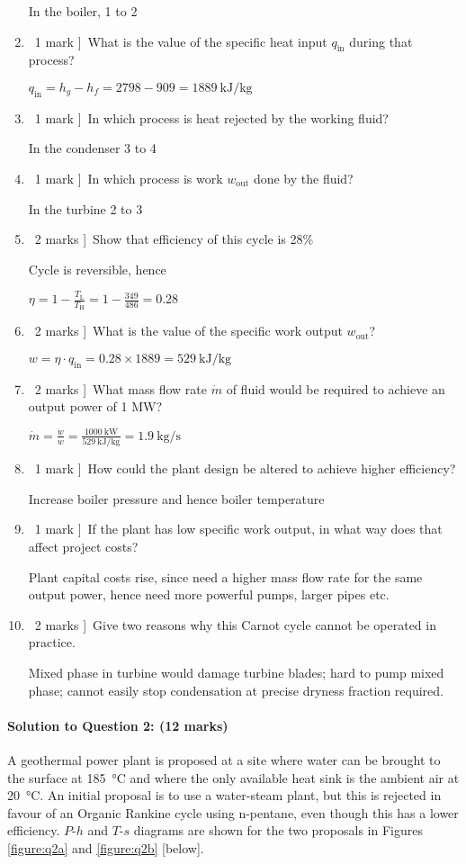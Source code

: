 \documentclass[a4paper,12pt,fleqn]{article}
\begin{document}
\begin{enumerate}[label=\alph*)]
In the boiler, 1 to 2
\item \lbrack\ 1 mark ]\ What is the value of the specific heat input $q_\mathrm{in}$ during that process?\par
$q_\mathrm{in}=h_g-h_f = 2798 - 909 = \SI{1889}{\kilo\joule\per\kg}$
\item \lbrack\ 1 mark ]\ In which process is heat rejected by the working fluid?\par
In the condenser 3 to 4
\item \lbrack\ 1 mark ]\ In which process is work $w_\mathrm{out}$ done by the fluid?\par
In the turbine 2 to 3
\item \lbrack\ 2 marks ]\ Show that efficiency of this cycle is 28\%\par
Cycle is reversible, hence\par $\eta=1-\frac{T_\mathrm{L}}{T_\mathrm{H}}=1-\frac{349}{486}=0.28$
\item \lbrack\ 2 marks ]\ What is the value of the specific work output $w_\mathrm{out}$?\par
$w=\eta\cdot q_\mathrm{in}=0.28\times 1889 = \SI{529}{\kilo\joule\per\kg}$
\item \lbrack\ 2 marks ]\ What mass flow rate $\dot m$ of fluid would be required to achieve an output power of 1 MW?\par
$\dot m =\frac{\dot w}{w}=\frac{\SI{1000}{\kilo\watt}}{\SI{529}{\kilo\joule\per\kg}}=\SI{1.9}{\kg\per\second}$
\item \lbrack\ 1 mark ]\ How could the plant design be altered to achieve higher efficiency?\par
Increase boiler pressure and hence boiler temperature
\item \lbrack\ 1 mark ]\ If the plant has low specific work output, in what way does that affect project costs?\par
Plant capital costs rise, since need a higher mass flow rate for the same output power, hence need more powerful pumps, larger pipes etc.
\item \lbrack\ 2 marks ]\ Give two reasons why this Carnot cycle cannot be operated in practice.\par
Mixed phase in turbine would damage turbine blades; hard to pump mixed phase; cannot easily stop condensation at precise dryness fraction required.
\end{enumerate}

\paragraph{\textbf{Solution to Question 2: (12 marks)}}
A geothermal power plant is proposed at a site where water can be brought to the surface at \SI{185}{\celsius} and where the only available heat sink is the ambient air at \SI{20}{\celsius}. An initial proposal is to use a water-steam plant, but this is rejected in favour of an Organic Rankine cycle using n-pentane, even though this has a lower efficiency.
$P$-$h$ and $T$-$s$ diagrams are shown for the two proposals in Figures \ref{figure:q2a} and \ref{figure:q2b} [below].
\end{document}
